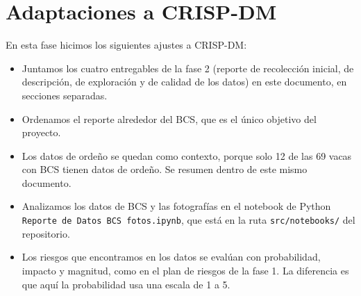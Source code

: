 \section*{Adaptaciones a CRISP-DM}

En esta fase hicimos los siguientes ajustes a CRISP-DM:

\begin{itemize}
  \item Juntamos los cuatro entregables de la fase 2 (reporte de recolección inicial, de descripción, de exploración y de calidad de los datos) en este documento, en secciones separadas.
  \item Ordenamos el reporte alrededor del BCS, que es el único objetivo del proyecto.
  \item Los datos de ordeño se quedan como contexto, porque solo 12 de las 69 vacas con BCS tienen datos de ordeño. Se resumen dentro de este mismo documento.
  \item Analizamos los datos de BCS y las fotografías en el notebook de Python \texttt{Reporte de Datos BCS fotos.ipynb}, que está en la ruta \texttt{src/notebooks/} del repositorio.
  \item Los riesgos que encontramos en los datos se evalúan con probabilidad, impacto y magnitud, como en el plan de riesgos de la fase 1. La diferencia es que aquí la probabilidad usa una escala de 1 a 5.
\end{itemize}

